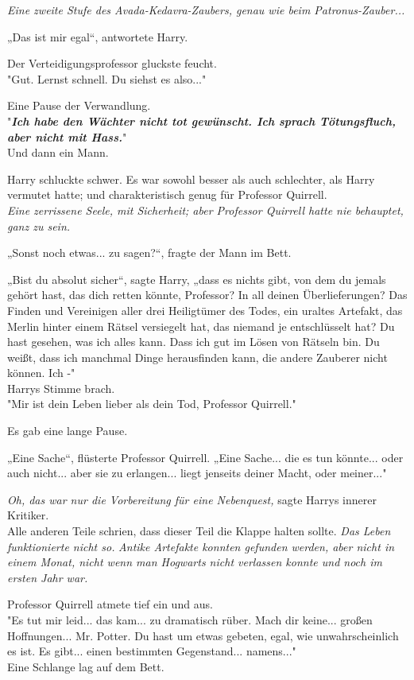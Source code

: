{\emph{Eine zweite Stufe des Avada-Kedavra-Zaubers, genau wie beim Patronus-Zauber...}

„Das ist mir egal“, antwortete Harry.

Der Verteidigungsprofessor gluckste feucht.\\ "Gut. Lernst schnell. Du siehst es also..."

Eine Pause der Verwandlung.\\ "\textbf{\emph{Ich habe den Wächter nicht tot gewünscht. Ich sprach Tötungsfluch, aber nicht mit Hass.}}"\\ Und dann ein Mann.

Harry schluckte schwer. Es war sowohl besser als auch schlechter, als Harry vermutet hatte; und charakteristisch genug für Professor Quirrell.\\ \emph{Eine zerrissene Seele, mit Sicherheit; aber Professor Quirrell hatte nie behauptet, ganz zu sein.}

„Sonst noch etwas... zu sagen?“, fragte der Mann im Bett.

„Bist du absolut sicher“, sagte Harry, „dass es nichts gibt, von dem du jemals gehört hast, das dich retten könnte, Professor? In all deinen Überlieferungen? Das Finden und Vereinigen aller drei Heiligtümer des Todes, ein uraltes Artefakt, das Merlin hinter einem Rätsel versiegelt hat, das niemand je entschlüsselt hat? Du hast gesehen, was ich alles kann. Dass ich gut im Lösen von Rätseln bin. Du weißt, dass ich manchmal Dinge herausfinden kann, die andere Zauberer nicht können. Ich -"\\ Harrys Stimme brach.\\ "Mir ist dein Leben lieber als dein Tod, Professor Quirrell."

Es gab eine lange Pause.

„Eine Sache“, flüsterte Professor Quirrell. „Eine Sache... die es tun könnte... oder auch nicht... aber sie zu erlangen... liegt jenseits deiner Macht, oder meiner..."

\emph{Oh, das war nur die Vorbereitung für eine Nebenquest,} sagte Harrys innerer Kritiker.\\ Alle anderen Teile schrien, dass dieser Teil die Klappe halten sollte. \emph{Das Leben funktionierte nicht so.} \emph{Antike Artefakte konnten gefunden werden, aber nicht in einem Monat, nicht wenn man Hogwarts nicht verlassen konnte und noch im ersten Jahr war.}

Professor Quirrell atmete tief ein und aus.\\ "Es tut mir leid... das kam... zu dramatisch rüber. Mach dir keine... großen Hoffnungen... Mr. Potter. Du hast um etwas gebeten, egal, wie unwahrscheinlich es ist. Es gibt... einen bestimmten Gegenstand... namens..."\\ Eine Schlange lag auf dem Bett.\\

}
